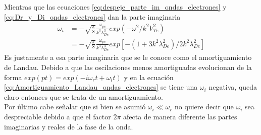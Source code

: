 \documentclass[../tesis_main_file.tex]{subfile}
\begin{document}
Mientras que las ecuaciones \ref{eq:despeje_parte_im_ondas_electrones} y \ref{eq:Dr_y_Di_ondas_electrones} dan la parte imaginaria
\begin{equation}
\label{eq:Amortiguamiento_Landau_ondas_electrones}
\begin{split}
\omega_i &=-\sqrt{\frac{\pi}{8}}\frac{\omega_{pe}}{k^3\lambda^3_{De}}exp(-\omega^2/k^2V^2_{Te})\\
&=-\sqrt{\frac{\pi}{8}}\frac{\omega_{pe}}{k^3\lambda^3_{De}}exp\left[-(1+3k^2\lambda^2_{De})/2k^2\lambda^2_{De}\right]
\end{split}
\end{equation}
Es justamente a esa parte imaginaria que se le conoce como el amortiguamiento de Landau. Debido a que las oscilaciones menos amortiguadas evolucionan de la forma $exp(pt)=exp(-i\omega_rt+\omega_it)$ y en la ecuación \ref{eq:Amortiguamiento_Landau_ondas_electrones} se tiene una $\omega_i$ negativa, queda claro entonces que se trata de un amortiguamiento.\\
Por último cabe señalar que si bien se asumió $\omega_i \ll \omega_r$ no quiere decir que $\omega_i$ sea despreciable debido a que el factor $2\pi$ afecta de manera diferente las partes imaginarias y reales de la fase de la onda.
\end{document}
